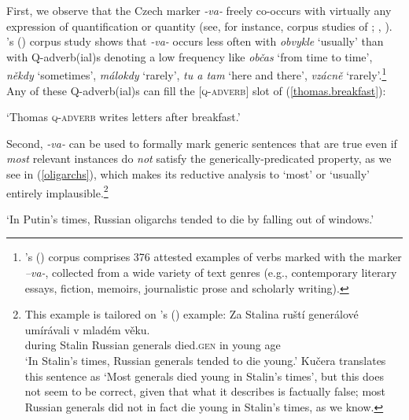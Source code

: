 \documentclass[output=paper,colorlinks,citecolor=brown]{langscibook}
\begin{document}
First, we observe that the Czech marker \textit{-va-} freely co-occurs with virtually any expression of quantification or quantity (see, for instance, corpus studies of
\citealt[62,~81]{sirokova1963}; \citealt{sirokova1965},  \citealt{danaher2003semantics}).
\citeauthor{danaher2003semantics}'s (\citeyear{danaher2003semantics}) corpus study shows
that \textit{-va-} occurs less often with \textit{obvykle} `usually’ than with Q-adverb(ial)s denoting a low frequency like \textit{občas} `from time to time’, \textit{někdy} `sometimes’, \textit{málokdy} `rarely’, \textit{tu a tam} `here and there’, \textit{vzácně} `rarely’.\footnote{\citeauthor{danaher2003semantics}'s (\citeyear{danaher2003semantics}) corpus comprises 376 attested examples of verbs marked with the marker  \textit{–va-}, collected from a wide variety of text genres (e.g., contemporary literary essays, fiction, memoirs, journalistic prose and scholarly writing).}  Any of
these Q-adverb(ial)s can fill  the  $[$\textsc{q-adverb}$]$ slot of (\ref{thomas.breakfast}):

\glt `Thomas \textsc{q-adverb}  writes letters after breakfast.'
\z

\noindent Second, \textit{-va-} can be used to formally mark generic sentences
that are true even if \textit{most} relevant instances do \textit{not} satisfy the generically-predicated property, as we see in (\ref{oligarchs}), which makes its reductive analysis to `most' or `usually' entirely implausible.\footnote{This example is tailored on \citeauthor{kucera1981aspect}'s (\citeyear{kucera1981aspect}) example:
\ea
\gll Za Stalina 	        ruští  generálové     umírávali    v mladém věku.	\\
during Stalin    Russian generals    died.\textsc{gen}   	        in young age\\
\glt `In Stalin's times, Russian generals tended to die young.'
\z
\noindent Kučera translates this sentence as `Most generals died young in Stalin's times', but this does not seem to be correct, given that what it describes is factually false; most Russian generals did not in fact die young in Stalin's times, as we know.}

\glt `In Putin's times, Russian oligarchs tended to die by falling out of windows.'
\z
\end{document}
